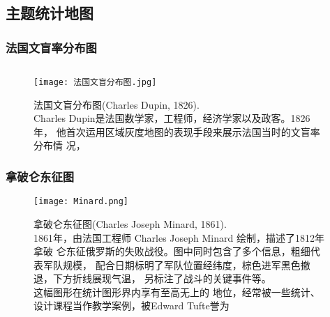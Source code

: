 \subsection{主题统计地图}
\subsubsection{法国文盲率分布图}
\begin{frame}{\subsecname}{\subsubsecname}

  \begin{figure}
    \begin{columns}
      \begin{column}{.6\textwidth}
        \texttt{[image: 法国文盲分布图.jpg]}
      \end{column}

      \begin{column}{.35\textwidth}
        \centering
        \caption{法国文盲分布图(Charles Dupin, 1826). \\
          Charles Dupin是法国数学家，工程师，经济学家以及政客。1826年，
          他首次运用区域灰度地图的表现手段来展示法国当时的文盲率分布情
          况，}
      \end{column}
    \end{columns}
  \end{figure}
\end{frame}

\subsubsection{拿破仑东征图}
\begin{frame}{\subsecname}{\subsubsecname}
  \begin{figure}
    \centering \texttt{[image: Minard.png]}
    \caption{拿破仑东征图(Charles Joseph Minard, 1861). \\
      1861年，由法国工程师 Charles Joseph Minard 绘制，描述了1812年拿破
      仑东征俄罗斯的失败战役。图中同时包含了多个信息，粗细代表军队规模，
      配合日期标明了军队位置经纬度，棕色进军黑色撤退，下方折线展现气温，
      另标注了战斗的关键事件等。\\这幅图形在统计图形界内享有至高无上的
      地位，经常被一些统计、设计课程当作教学案例，被Edward
      Tufte\footnotemark[1]誉为}
  \end{figure}
\end{frame}

